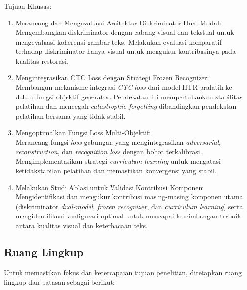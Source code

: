 Tujuan Khusus:

\begin{enumerate}[label=\alph*., leftmargin=1.5em, labelsep=0.5em, itemindent=0pt, noitemsep, topsep=0pt]
      \item Merancang dan Mengevaluasi Arsitektur Diskriminator Dual-Modal: \\
            Mengembangkan diskriminator dengan cabang visual dan tekstual untuk mengevaluasi koherensi gambar-teks. Melakukan evaluasi komparatif terhadap diskriminator hanya visual untuk mengukur kontribusinya pada kualitas restorasi.

      \item Mengintegrasikan CTC Loss dengan Strategi Frozen Recognizer: \\
            Membangun mekanisme integrasi \textit{CTC loss} dari model HTR pralatih ke dalam fungsi objektif generator. Pendekatan ini mempertahankan stabilitas pelatihan dan mencegah \textit{catastrophic forgetting} dibandingkan pendekatan pelatihan bersama yang tidak stabil.

      \item Mengoptimalkan Fungsi Loss Multi-Objektif: \\
            Merancang fungsi \textit{loss} gabungan yang mengintegrasikan \textit{adversarial}, \textit{reconstruction}, dan \textit{recognition loss} dengan bobot terkalibrasi. Mengimplementasikan strategi \textit{curriculum learning} untuk mengatasi ketidakstabilan pelatihan dan memastikan konvergensi yang stabil.

      \item Melakukan Studi Ablasi untuk Validasi Kontribusi Komponen: \\
            Mengidentifikasi dan mengukur kontribusi masing-masing komponen utama (diskriminator \textit{dual-modal}, \textit{frozen recognizer}, dan \textit{curriculum learning}) serta mengidentifikasi konfigurasi optimal untuk mencapai keseimbangan terbaik antara kualitas visual dan keterbacaan teks.
\end{enumerate}

\subsection{Ruang Lingkup}
\label{subsec:ruang-lingkup}

Untuk memastikan fokus dan ketercapaian tujuan penelitian, ditetapkan ruang lingkup dan batasan sebagai berikut:

